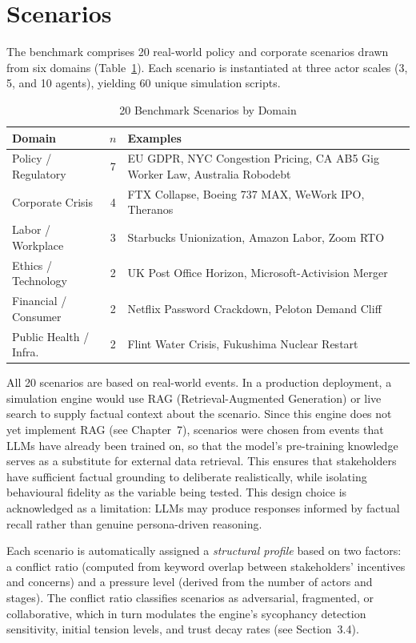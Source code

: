 \documentclass[12pt, a4paper]{report}
\begin{document}
\section{Scenarios}

The benchmark comprises 20 real-world policy and corporate scenarios drawn from six domains (Table~\ref{tab:scenarios}). Each scenario is instantiated at three actor scales (3, 5, and 10 agents), yielding 60 unique simulation scripts.

\begin{table}[t]
\centering
\caption{20 Benchmark Scenarios by Domain}
\label{tab:scenarios}
\begin{tabular}{p{3.5cm}cp{10cm}}
\toprule
Domain & $n$ & Examples \\
\midrule
Policy / Regulatory    & 7 & EU GDPR, NYC Congestion Pricing, CA AB5 Gig Worker Law, Australia Robodebt \\
Corporate Crisis       & 4 & FTX Collapse, Boeing 737 MAX, WeWork IPO, Theranos \\
Labor / Workplace      & 3 & Starbucks Unionization, Amazon Labor, Zoom RTO \\
Ethics / Technology    & 2 & UK Post Office Horizon, Microsoft-Activision Merger \\
Financial / Consumer   & 2 & Netflix Password Crackdown, Peloton Demand Cliff \\
Public Health / Infra. & 2 & Flint Water Crisis, Fukushima Nuclear Restart \\
\bottomrule
\end{tabular}
\end{table}

All 20 scenarios are based on real-world events. In a production deployment, a simulation engine would use RAG (Retrieval-Augmented Generation) or live search to supply factual context about the scenario. Since this engine does not yet implement RAG (see Chapter~7), scenarios were chosen from events that LLMs have already been trained on, so that the model's pre-training knowledge serves as a substitute for external data retrieval. This ensures that stakeholders have sufficient factual grounding to deliberate realistically, while isolating behavioural fidelity as the variable being tested. This design choice is acknowledged as a limitation: LLMs may produce responses informed by factual recall rather than genuine persona-driven reasoning.

Each scenario is automatically assigned a \textit{structural profile} based on two factors: a conflict ratio (computed from keyword overlap between stakeholders' incentives and concerns) and a pressure level (derived from the number of actors and stages). The conflict ratio classifies scenarios as adversarial, fragmented, or collaborative, which in turn modulates the engine's sycophancy detection sensitivity, initial tension levels, and trust decay rates (see Section~3.4).
\end{document}
